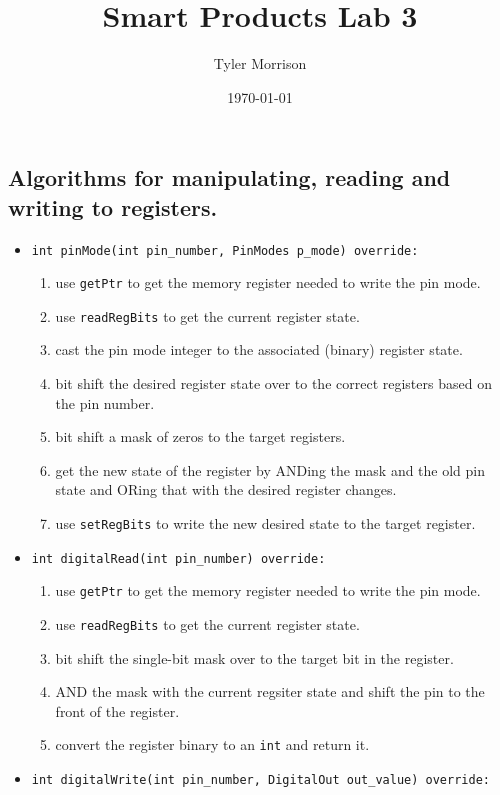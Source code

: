 \documentclass{article}
\title{Smart Products Lab 3}
\author{Tyler Morrison}
\date\today
\begin{document}
\maketitle
\section{}
\subsection{Algorithms for manipulating, reading and writing to registers.}
\begin{itemize}
	\item \texttt{int pinMode(int pin_number, PinModes p_mode) override:}
		\begin{enumerate}
			\item use \texttt{getPtr} to get the memory register needed to write the pin mode.
			\item use \texttt{readRegBits} to get the current register state.
			\item cast the pin mode integer to the associated (binary) register state.
			\item bit shift the desired register state over to the correct registers based on the pin number.
			\item bit shift a mask of zeros to the target registers.
			\item get the new state of the register by ANDing the mask and the old pin state and ORing that with the desired register changes.
			\item use \texttt{setRegBits} to write the new desired state to the target register.
		\end{enumerate}
	\item \texttt{int digitalRead(int pin_number) override:}
		\begin{enumerate}
			\item use \texttt{getPtr} to get the memory register needed to write the pin mode.
			\item use \texttt{readRegBits} to get the current register state.
			\item bit shift the single-bit mask over to the target bit in the register. 
			\item AND the mask with the current regsiter state and shift the pin to the front of the register.
			\item convert the register binary to an \texttt{int} and return it.
		\end{enumerate}
	\item \texttt{int digitalWrite(int pin_number, DigitalOut out_value) override:}

\end{itemize}
\end{document}
